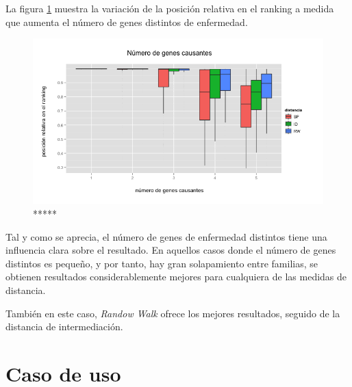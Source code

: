 \medskip
La figura \ref{fig:disease} muestra la variación de la posición relativa en el ranking a medida que aumenta el número de genes distintos de enfermedad.

\begin{figure}[H]
\centering
\includegraphics[scale=0.5]{images/tabla_disease.png}
\caption{*****}
\label{fig:disease} 
\end{figure}

\medskip
Tal y como se aprecia, el número de genes de enfermedad distintos tiene una influencia clara sobre el resultado. En aquellos casos donde el número de genes distintos es pequeño, y por tanto, hay gran solapamiento entre familias, se obtienen resultados considerablemente mejores para cualquiera de las medidas de distancia. 

\medskip
También en este caso, \emph{Randow Walk }ofrece los mejores resultados, seguido de la distancia de intermediación.

\section{Caso de uso}
